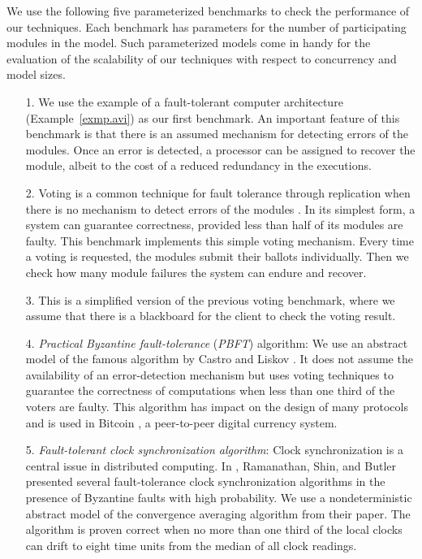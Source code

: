 \documentclass[times,10pt,twocolumn]{article}
\begin{document}
We use the following five parameterized 
benchmarks to check the performance of our techniques. 
Each benchmark has parameters for the number of participating 
modules in the model.  
Such parameterized models come in handy for the evaluation of the scalability of our techniques with respect to concurrency and model sizes.  
\begin{itemize} 
\item[1.] We use the example of a fault-tolerant computer architecture 
  (Example~\ref{exmp.avi}) as our first benchmark.  
  An important feature of this benchmark is that there is an 
  assumed mechanism for\label{reply2.mechanism.in} detecting errors of the modules.  
  Once an error is detected, a processor can be assigned to recover the 
  module, albeit to the cost of a reduced redundancy in the executions.
\item[2.] \label{reply2.bch2} 
	Voting is a common technique for fault tolerance through 
  replication when there is no mechanism to detect errors of the 
  modules \cite{Pradhan96}.  
  In its simplest form, a system can guarantee correctness, provided less than half of its modules are faulty.   
  This benchmark implements this simple voting mechanism.  
  Every time a voting is requested, the modules submit their ballots individually.  
  Then we check how many module failures the system can endure and recover. 
\item[3.] This is a simplified version of the previous voting benchmark, where we assume that there is a blackboard 
  for the client to check the voting result.  
\item[4.] {\em Practical Byzantine fault-tolerance} ({\em PBFT}) algorithm: 
  We use an abstract model of the famous algorithm by 
  Castro and Liskov \cite{CL99}. 
  It does not assume the availability of an error-detection 
  mechanism but uses 
  voting techniques to guarantee the correctness of 
  computations when less than one third of the voters are faulty.  
  This algorithm has impact on the design of many protocols 
  \cite{AGGRW05,CMLRS06,KADCW09,GKVQ10,CWADM09} and is used in 
  Bitcoin \cite{bitcoin}, a peer-to-peer digital currency system.  
\item[5.] {\em Fault-tolerant clock synchronization algorithm}: 
  Clock synchronization is a central issue in distributed computing. 
  In \cite{RSB90}, 
  Ramanathan, Shin, and Butler presented 
  several fault-tolerance clock synchronization algorithms 
  in the presence of Byzantine faults with high probability.  
  We use a nondeterministic abstract model of the convergence averaging 
  algorithm from their paper.  
  The algorithm is proven correct when no more than one third of the 
  local clocks can drift to eight time units from the median of all clock 
  readings.  
\end{itemize}
\smallskip
\end{document}
